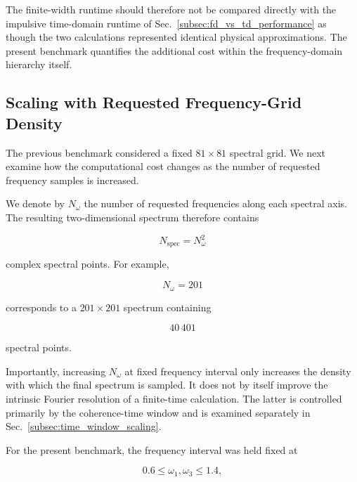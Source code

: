 \documentclass[11pt]{article}
\begin{document}
The finite-width runtime should therefore not be compared directly
with the impulsive time-domain runtime of
Sec.~\ref{subsec:fd_vs_td_performance} as though the two calculations
represented identical physical approximations. The present benchmark
quantifies the additional cost within the frequency-domain hierarchy
itself.

\subsection{Scaling with Requested Frequency-Grid Density}
\label{subsec:frequency_grid_scaling}

The previous benchmark considered a fixed $81\times81$ spectral grid.
We next examine how the computational cost changes as the number of
requested frequency samples is increased.

We denote by $N_\omega$ the number of requested frequencies along each
spectral axis.  The resulting two-dimensional spectrum therefore
contains

\begin{equation}
\boxed{
N_{\mathrm{spec}}
=
N_\omega^2
}
\end{equation}

complex spectral points.  For example,

\begin{equation}
N_\omega=201
\end{equation}

corresponds to a $201\times201$ spectrum containing

\begin{equation}
40\,401
\end{equation}

spectral points.

Importantly, increasing $N_\omega$ at fixed frequency interval only
increases the density with which the final spectrum is sampled.  It
does not by itself improve the intrinsic Fourier resolution of a
finite-time calculation.  The latter is controlled primarily by the
coherence-time window and is examined separately in
Sec.~\ref{subsec:time_window_scaling}.

For the present benchmark, the frequency interval was held fixed at

\begin{equation}
0.6
\leq
\omega_1,\omega_3
\leq
1.4,
\end{equation}
\end{document}

